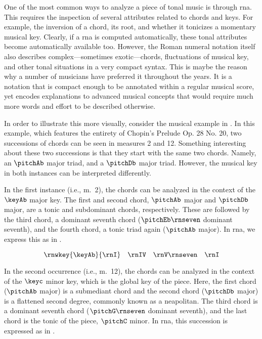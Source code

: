 
One of the most common ways to analyze a piece of tonal
music is through \gls{rna}. This requires the inspection of
several attributes related to chords and keys. For example,
the inversion of a chord, its root, and whether it tonicizes
a momentary musical key. Clearly, if a \gls{rna} is computed
automatically, these tonal attributes become automatically
available too. However, the Roman numeral notation itself
also describes complex---sometimes exotic---chords,
fluctuations of musical key, and other tonal situations in a
very compact syntax. This is maybe the reason why a number
of musicians have preferred it throughout the years. It is a
notation that is compact enough to be annotated within a
regular musical score, yet encodes explanations to advanced
musical concepts that would require much more words and
effort to be described otherwise.

In order to illustrate this more visually, consider the
musical example in . In this
example, which features the entirety of Chopin's Prelude Op.
28 No. 20, two successions of chords can be seen in measures
2 and 12. Something interesting about these two successions
is that they start with the same two chords. Namely, an
$\pitchAb$ major triad, and a $\pitchDb$ major triad.
However, the musical key in both instances can be
interpreted differently.


In the first instance (i.e., m.~2), the chords can be
analyzed in the context of the $\keyAb$ major key. The first
and second chord, $\pitchAb$ major and $\pitchDb$ major, are
a tonic and subdominant chords, respectively. These are
followed by the third chord, a dominant seventh chord
($\pitchEb\rnseven$ dominant seventh), and the fourth chord,
a tonic triad again ($\pitchAb$ major). In \gls{rna}, we
express this as in .

\begin{equation}
    \label{eq:succession1}
    \rnwkey{\keyAb}{\rnI} \quad \rnIV \quad \rnV\rnseven \quad \rnI
\end{equation}

In the second occurrence (i.e., m.~12), the chords can be
analyzed in the context of the $\keyc$ minor key, which is
the global key of the piece. Here, the first chord
($\pitchAb$ major) is a submediant chord and the second
chord ($\pitchDb$ major) is a flattened second degree,
commonly known as a \gls{neapolitan}. The third chord is a
dominant seventh chord ($\pitchG\rnseven$ dominant seventh),
and the last chord is the tonic of the piece, $\pitchC$
minor. In \gls{rna}, this succession is expressed as in
.

